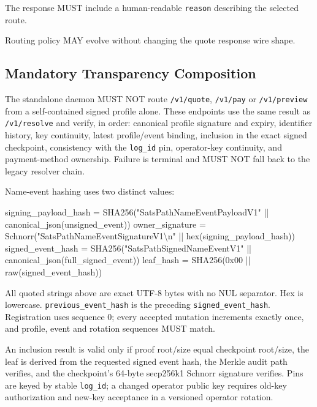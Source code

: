 \documentclass[
]{article}
\newenvironment{Shaded}{}{}
\newcommand{\NormalTok}[1]{#1}
\begin{document}
The response MUST include a human-readable \texttt{reason} describing
the selected route.

Routing policy MAY evolve without changing the quote response wire
shape.

\hypertarget{mandatory-transparency-composition}{%
\subsection{Mandatory Transparency
Composition}\label{mandatory-transparency-composition}}

The standalone daemon MUST NOT route \texttt{/v1/quote},
\texttt{/v1/pay} or \texttt{/v1/preview} from a self-contained signed
profile alone. These endpoints use the same result as
\texttt{/v1/resolve} and verify, in order: canonical profile signature
and expiry, identifier history, key continuity, latest profile/event
binding, inclusion in the exact signed checkpoint, consistency with the
\texttt{log\_id} pin, operator-key continuity, and payment-method
ownership. Failure is terminal and MUST NOT fall back to the legacy
resolver chain.

Name-event hashing uses two distinct values:

\begin{Shaded}
\begin{Highlighting}[]
\NormalTok{signing\_payload\_hash = SHA256("SatsPathNameEventPayloadV1" || canonical\_json(unsigned\_event))}
\NormalTok{owner\_signature      = Schnorr("SatsPathNameEventSignatureV1\textbackslash{}n" || hex(signing\_payload\_hash))}
\NormalTok{signed\_event\_hash    = SHA256("SatsPathSignedNameEventV1" || canonical\_json(full\_signed\_event))}
\NormalTok{leaf\_hash            = SHA256(0x00 || raw(signed\_event\_hash))}
\end{Highlighting}
\end{Shaded}

All quoted strings above are exact UTF-8 bytes with no NUL separator.
Hex is lowercase. \texttt{previous\_event\_hash} is the preceding
\texttt{signed\_event\_hash}. Registration uses sequence 0; every
accepted mutation increments exactly once, and profile, event and
rotation sequences MUST match.

An inclusion result is valid only if proof root/size equal checkpoint
root/size, the leaf is derived from the requested signed event hash, the
Merkle audit path verifies, and the checkpoint's 64-byte secp256k1
Schnorr signature verifies. Pins are keyed by stable \texttt{log\_id}; a
changed operator public key requires old-key authorization and new-key
acceptance in a versioned operator rotation.
\end{document}
